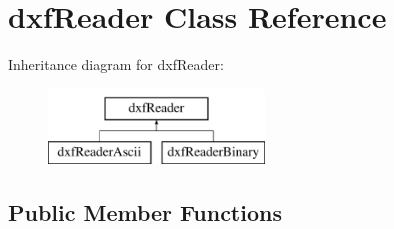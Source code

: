 \hypertarget{classdxfReader}{\section{dxf\-Reader Class Reference}
\label{classdxfReader}
}
Inheritance diagram for dxf\-Reader\-:\begin{figure}[H]
\begin{center}
\leavevmode
\includegraphics[height=2.000000cm]{classdxfReader}
\end{center}
\end{figure}
\subsection*{Public Member Functions}
